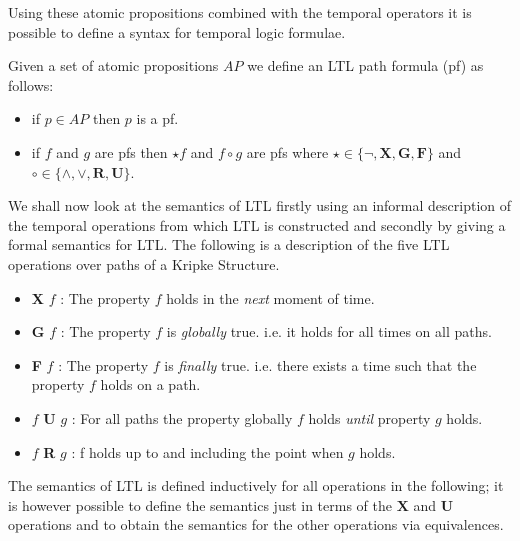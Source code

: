 Using these atomic propositions combined with the temporal operators it is possible to define a syntax for temporal logic formulae.
\medskip
\begin{mydef}
Given a set of atomic propositions $AP$ we define an LTL path formula (pf) as follows:

\begin{itemize}
\item if $p \in AP$ then $p$ is a pf.

\item if $f$ and $g$ are pfs then $\star f$ and $f \circ g$ are pfs where $\star \in \{\neg,\mathbf{X},\mathbf{G}, \mathbf{F}\}$ and $\circ \in \{ \wedge,\vee,\textbf{R},\textbf{U} \}$.
\end{itemize}

\end{mydef}
\medskip
We shall now look at the semantics of LTL firstly using an informal description of the temporal operations from which LTL is constructed and secondly by giving a formal semantics for LTL. The following is a description of the five LTL operations over paths of a Kripke Structure.
\begin{itemize}
\item \textbf{X} $f$ : The property $f$ holds in the \emph{next} moment of time.
\item \textbf{G} $f$ : The property $f$ is \emph{globally} true. i.e. it holds for all times on all paths. 
\item \textbf{F} $f$ : The property $f$ is \emph{finally} true. i.e. there exists a time such that the property $f$ holds on a path.
\item $f$ \textbf{U} $g$ : For all paths the property globally $f$ holds \emph{until} property $g$ holds. 
\item $f$ \textbf{R} $g$ : f holds up to and including the point when $g$ holds.
\end{itemize}


The semantics of LTL is defined inductively for all operations in the following; it is however possible to define the semantics just in terms of the $\mathbf{X}$ and $\mathbf{U}$ operations and to obtain the semantics for the other operations via equivalences.

